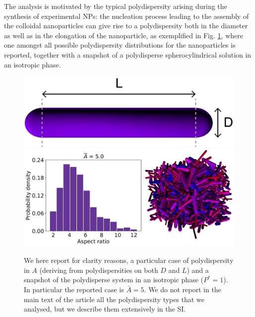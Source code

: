 \documentclass[journal=jacsat,manuscript=article]{achemso}
\begin{document}
The analysis is motivated by the typical polydispersity arising during the synthesis of experimental NPs: the nucleation process leading to the assembly of the colloidal nanoparticles can give rise to a polydispersity both in the diameter as well as in the elongation of the nanoparticle, as exemplified in  Fig. \ref{fig:HSC_model}, where one amongst all possible polydispersity distributions for the nanoparticles is reported, together with a snapshot of a  polydisperse spherocylindrical solution  in an isotropic phase. 
\begin{figure}[!ht]
    \centering
    \includegraphics[width=0.2 \columnwidth]{Figures/A5_scheme.png}
    \includegraphics[width=0.7\columnwidth]{Figures/Polydisp_hist.png}
    \caption{We here report for clarity reasons, a particular case of polydispersity  in $A$ (deriving from polydispersities on both $D$ and $L$) and a snapshot of the polydisperse system  in an isotropic phase ($P^*=1$). In particular the reported case is $\bar{A}=5$. We do not report in the main text of the article all the polydispersity types that we analysed, but we describe  them extensively  in the SI.}
    \label{fig:HSC_model}
\end{figure}
\end{document}
